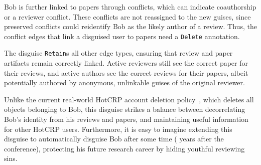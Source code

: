 %
Bob is further linked to papers through conflicts, which can indicate coauthorship or a
reviewer conflict.
%
These conflicts are not reassigned to the new guises, since preserved
conflicts could reidentify Bob as the likely author of a review. Thus, the
conflict edges that link a disguised user to papers need a \texttt{Delete} annotation.
%

The disguise \texttt{Retain}s all other edge types, ensuring that review and paper
artifacts remain correctly linked. Active reviewers still see the correct paper for their reviews,
and active authors see the correct reviews for their papers, albeit potentially authored by
anonymous, unlinkable guises of the original reviewer.
%
%

%
Unlike the current real-world HotCRP account deletion policy~\cite{hotcrp:privacy}, which
deletes all objects belonging to Bob, this disguise strikes a balance between decorrelating
Bob's identity from his reviews and papers, and maintaining useful information for other
HotCRP users.
%
Furthermore, it is easy to imagine extending this disguise to automatically disguise Bob
after some time ( years after the conference), protecting his future research career
by hiding youthful reviewing sins.
